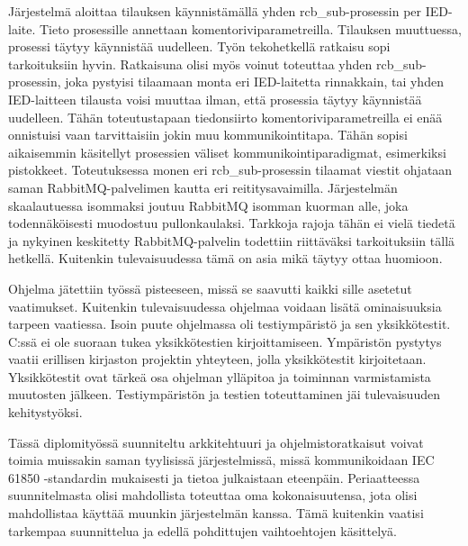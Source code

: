 Järjestelmä aloittaa tilauksen käynnistämällä yhden rcb\_sub-prosessin per IED-laite. Tieto prosessille annettaan komentoriviparametreilla. Tilauksen muuttuessa, prosessi täytyy käynnistää uudelleen. Työn tekohetkellä ratkaisu sopi tarkoituksiin hyvin. Ratkaisuna olisi myös voinut toteuttaa yhden rcb\_sub-prosessin, joka pystyisi tilaamaan monta eri IED-laitetta rinnakkain, tai yhden IED-laitteen tilausta voisi muuttaa ilman, että prosessia täytyy käynnistää uudelleen. Tähän toteutustapaan tiedonsiirto komentoriviparametreilla ei enää onnistuisi vaan tarvittaisiin jokin muu kommunikointitapa. Tähän sopisi aikaisemmin käsitellyt prosessien väliset kommunikointiparadigmat, esimerkiksi pistokkeet. Toteutuksessa monen eri rcb\_sub-prosessin tilaamat viestit ohjataan saman RabbitMQ-palvelimen kautta eri reititysavaimilla. Järjestelmän skaalautuessa isommaksi joutuu RabbitMQ isomman kuorman alle, joka todennäköisesti muodostuu pullonkaulaksi. Tarkkoja rajoja tähän ei vielä tiedetä ja nykyinen keskitetty RabbitMQ-palvelin todettiin riittäväksi tarkoituksiin tällä hetkellä. Kuitenkin tulevaisuudessa tämä on asia mikä täytyy ottaa huomioon.

Ohjelma jätettiin työssä pisteeseen, missä se saavutti kaikki sille asetetut vaatimukset. Kuitenkin tulevaisuudessa ohjelmaa voidaan lisätä ominaisuuksia tarpeen vaatiessa. Isoin puute ohjelmassa oli testiympäristö ja sen yksikkötestit. C:ssä ei ole suoraan tukea yksikkötestien kirjoittamiseen. Ympäristön pystytys vaatii erillisen kirjaston projektin yhteyteen, jolla yksikkötestit kirjoitetaan. Yksikkötestit ovat tärkeä osa ohjelman ylläpitoa ja toiminnan varmistamista muutosten jälkeen. Testiympäristön ja testien toteuttaminen jäi tulevaisuuden kehitystyöksi.

Tässä diplomityössä suunniteltu arkkitehtuuri ja ohjelmistoratkaisut voivat toimia muissakin saman tyylisissä järjestelmissä, missä kommunikoidaan IEC 61850 -standardin mukaisesti ja tietoa julkaistaan eteenpäin. Periaatteessa suunnitelmasta olisi mahdollista toteuttaa oma kokonaisuutensa, jota olisi mahdollistaa käyttää muunkin järjestelmän kanssa. Tämä kuitenkin vaatisi tarkempaa suunnittelua ja edellä pohdittujen vaihtoehtojen käsittelyä.